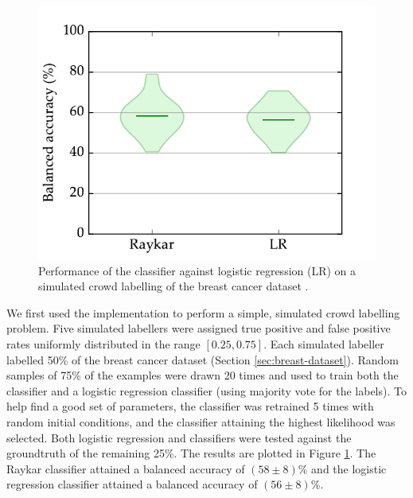             \begin{figure}
                \centering
                \includegraphics[height=0.3\textheight]
                    {images/experiments/raykar.pdf}
                \caption{Performance of the \citeauthor{raykar10} classifier
                    against logistic regression (LR) on a simulated crowd
                    labelling of the breast cancer dataset \citep{wolberg90}.}
                \label{fig:raykar}
            \end{figure}

            We first used the implementation to perform a simple, simulated
            crowd labelling problem. Five simulated labellers were assigned true
            positive and false positive rates uniformly distributed in the range
            $[0.25, 0.75]$. Each simulated labeller labelled 50\% of the breast
            cancer dataset (Section \ref{sec:breast-dataset}). Random samples of
            75\% of the examples were drawn 20 times and used to train both the
            \citeauthor{raykar10} classifier and a logistic regression
            classifier (using majority vote for the labels). To help find a good
            set of parameters, the \citeauthor{raykar10} classifier was
            retrained 5 times with random initial conditions, and the classifier
            attaining the highest likelihood was selected. Both logistic
            regression and \citeauthor{raykar10} classifiers were tested against
            the groundtruth of the remaining 25\%. The results are plotted in
            Figure \ref{fig:raykar}. The Raykar classifier attained a balanced
            accuracy of $(58 \pm 8)\%$ and the logistic regression classifier
            attained a balanced accuracy of $(56
            \pm 8)\%$.

